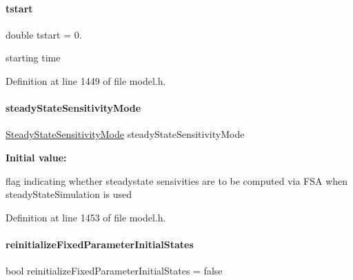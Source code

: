 \mbox{\label{classamici_1_1_model_a514d7e4eb49966fc7d165e0f87fe7f3c}} 
\paragraph{\texorpdfstring{tstart}{tstart}}
{\footnotesize\ttfamily double tstart = 0.\hspace{0.3cm}{\ttfamily [protected]}}

starting time 

Definition at line 1449 of file model.\+h.

\mbox{\label{classamici_1_1_model_a27c46c338afef0ba6da6d0695aa5e844}} 
\paragraph{\texorpdfstring{steadyStateSensitivityMode}{steadyStateSensitivityMode}}
{\footnotesize\ttfamily \mbox{\hyperlink{namespaceamici_a1f7d44f04185d57423d01d47d13470a6}{Steady\+State\+Sensitivity\+Mode}} steady\+State\+Sensitivity\+Mode\hspace{0.3cm}{\ttfamily [protected]}}

{\bfseries Initial value\+:}
\begin{DoxyCode}{0}
\DoxyCodeLine{=}

\end{DoxyCode}
flag indicating whether steadystate sensivities are to be computed via F\+SA when steady\+State\+Simulation is used 

Definition at line 1453 of file model.\+h.

\mbox{\label{classamici_1_1_model_a48ac1f2997787adc548bd6bfcec857d5}} 
\paragraph{\texorpdfstring{reinitializeFixedParameterInitialStates}{reinitializeFixedParameterInitialStates}}
{\footnotesize\ttfamily bool reinitialize\+Fixed\+Parameter\+Initial\+States = false\hspace{0.3cm}{\ttfamily [protected]}}


